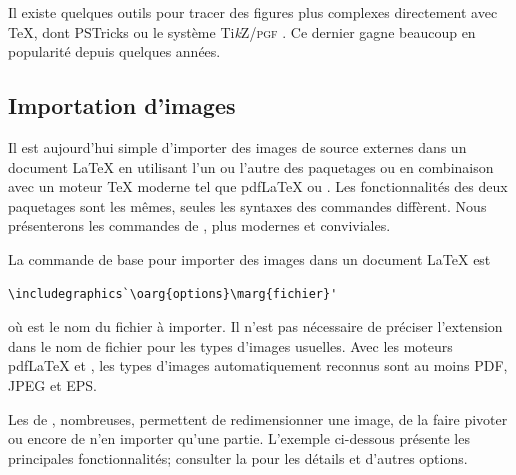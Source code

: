 Il existe quelques outils pour tracer des figures plus complexes
directement avec {\TeX}, dont PSTricks \citep{pstricks}
ou le système Ti\emph{k}Z/\textsc{pgf} \citep{tikz}.
Ce dernier gagne beaucoup en popularité depuis quelques années.


\subsection{Importation d'images}
\label{sec:tableaux:figures:graphics}

Il est aujourd'hui simple d'importer des images de source externes
dans un document {\LaTeX} en utilisant l'un ou l'autre des paquetages
 ou  \citep{graphicx} en combinaison avec
un moteur {\TeX} moderne tel que pdf{\LaTeX} ou {\XeLaTeX}. Les
fonctionnalités des deux paquetages sont les mêmes, seules les
syntaxes des commandes diffèrent. Nous présenterons les commandes de
, plus modernes et conviviales.

La commande de base pour importer des images dans un document {\LaTeX} est
\begin{lstlisting}
\includegraphics`\oarg{options}\marg{fichier}'
\end{lstlisting}
où  est le nom du fichier à importer. Il n'est pas
nécessaire de préciser l'extension dans le nom de fichier pour les
types d'images usuelles. Avec les moteurs pdf{\LaTeX} et {\XeLaTeX},
les types d'images automatiquement reconnus sont au moins PDF, JPEG et
EPS.

Les  de , nombreuses, permettent
de redimensionner une image, de la faire pivoter ou encore de n'en
importer qu'une partie. L'exemple ci-dessous présente les principales
fonctionnalités; consulter la %
pour les détails et d'autres options.

